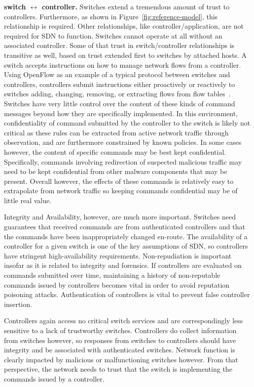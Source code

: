 \documentclass[10pt,conference]{IEEEtran}
\begin{document}
\noindent
{\bf switch $\leftrightarrow$ controller.}
Switches extend a tremendous amount of trust to controllers.  Furthermore, as shown in Figure~\ref{fig:reference-model}, this relationship is required.  Other relationships, like controller/application, are not required for SDN to function. Switches cannot operate at all without an associated controller.  Some of that trust in switch/controller relationships is transitive as well, based on trust extended first to switches by attached hosts.  A switch accepts instructions on how to manage network flows from a controller.  Using OpenFlow as an example of a typical protocol between switches and controllers, controllers submit instructions either proactively or reactively to switches adding, changing, removing, or extracting flows from flow tables~\cite{openflow1.4}.  Switches have very little control over the content of these kinds of command messages beyond how they are specifically implemented.  In this environment, confidentiality of command submitted by the controller to the switch is likely not critical as these rules can be extracted from active network traffic through observation, and are furthermore constrained by known policies.  In some cases however, the content of specific commands may be best kept confidential.  Specifically, commands involving redirection of suspected malicious traffic may need to be kept confidential from other malware components that may be present.  Overall however, the effects of these commands is relatively easy to extrapolate from network traffic so keeping commands confidential may be of little real value.

Integrity and Availability, however, are much more important.  Switches need guarantees that received commands are from authenticated controllers and that the commands have been inappropriately changed en-route.  The availability of a controller for a given switch is one of the key assumptions of SDN, so controllers have stringent high-availability requirements.  Non-repudiation is important insofar as it is related to integrity and forensics.  If controllers are evaluated on commands submitted over time, maintaining a history of non-reputable commands issued by controllers becomes vital in order to avoid reputation poisoning attacks.  Authentication of controllers is vital to prevent false controller insertion.

Controllers again access no critical switch services and are correspondingly less sensitive to a lack of trustworthy switches.  Controllers do collect information from switches however, so responses from switches to controllers should have integrity and be associated with authenticated switches.  Network function is clearly impacted by malicious or malfunctioning switches however.  From that perspective, the network needs to trust that the switch is implementing the commands issued by a controller.
\end{document}
